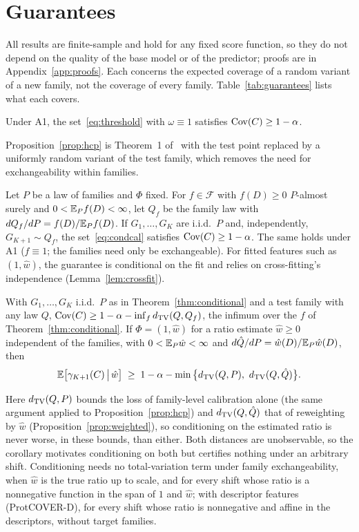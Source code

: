 \section{Guarantees}\label{sec:theory}

All results are finite-sample and hold for any fixed score function, so they do not depend on the quality of the base model or of the predictor; proofs are in Appendix~\ref{app:proofs}. Each concerns the expected coverage of a random variant of a new family, not the coverage of every family. Table~\ref{tab:guarantees} lists what each covers.

\begin{proposition}\label{prop:hcp}
Under A1, the set~\eqref{eq:threshold} with $\omega\equiv1$ satisfies $\mathrm{Cov}(C)\ge1-\alpha$.
\end{proposition}
Proposition~\ref{prop:hcp} is Theorem~1 of~\cite{lee2026hierarchical} with the test point replaced by a uniformly random variant of the test family, which removes the need for exchangeability within families.

\begin{theorem}\label{thm:conditional}
Let $P$ be a law of families and $\Phi$ fixed. For $f\in\mathcal{F}$ with $f(D)\ge0$ $P$-almost surely and $0<\mathbb{E}_Pf(D)<\infty$, let $Q_f$ be the family law with $dQ_f/dP=f(D)/\mathbb{E}_Pf(D)$. If $G_1,\dots,G_K$ are i.i.d.\ $P$ and, independently, $G_{K+1}\sim Q_f$, the set~\eqref{eq:condcal} satisfies $\mathrm{Cov}(C)\ge1-\alpha$. The same holds under A1 ($f\equiv1$; the families need only be exchangeable). For fitted features such as $(1,\hat w)$, the guarantee is conditional on the fit and relies on cross-fitting's independence (Lemma~\ref{lem:crossfit}).
\end{theorem}

\begin{corollary}\label{cor:conditional}
With $G_1,\dots,G_K$ i.i.d.\ $P$ as in Theorem~\ref{thm:conditional} and a test family with any law $Q$, $\mathrm{Cov}(C)\ge1-\alpha-\inf_fd_{\mathrm{TV}}(Q,Q_f)$, the infimum over the $f$ of Theorem~\ref{thm:conditional}. If $\Phi=(1,\hat w)$ for a ratio estimate $\hat w\ge0$ independent of the families, with $0<\mathbb{E}_P\hat w<\infty$ and $d\hat Q/dP=\hat w(D)/\mathbb{E}_P\hat w(D)$, then
\[
\mathbb{E}\big[\gamma_{K+1}(C)\,\big|\,\hat w\big]\;\ge\;1-\alpha-\min\big\{d_{\mathrm{TV}}(Q,P),\ d_{\mathrm{TV}}(Q,\hat Q)\big\}.
\]
\end{corollary}
Here $d_{\mathrm{TV}}(Q,P)$ bounds the loss of family-level calibration alone (the same argument applied to Proposition~\ref{prop:hcp}) and $d_{\mathrm{TV}}(Q,\hat Q)$ that of reweighting by $\hat w$ (Proposition~\ref{prop:weighted}), so conditioning on the estimated ratio is never worse, in these bounds, than either. Both distances are unobservable, so the corollary motivates conditioning on both but certifies nothing under an arbitrary shift. Conditioning needs no total-variation term under family exchangeability, when $\hat w$ is the true ratio up to scale, and for every shift whose ratio is a nonnegative function in the span of $1$ and $\hat w$; with descriptor features (ProtCOVER-D), for every shift whose ratio is nonnegative and affine in the descriptors, without target families.

